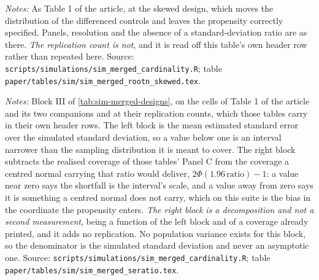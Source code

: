 \documentclass[
  12pt]{article}
\newcommand{\1}[1]{\mathds{1}\left[#1\right]}
\theoremstyle{plain}
\theoremstyle{definition}
\theoremstyle{definition}
\theoremstyle{remark}
\begin{document}
\begin{table}[p]
\centering
\begin{threeparttable}
\caption{The shipped engine at three cardinalities: the skewed design}
\label{tab:sim-merged-rootn-skewed}
\footnotesize

\begin{tablenotes}\footnotesize
\item \textit{Notes:} As Table 1 of the article, at the skewed
design, which moves the distribution of the differenced controls and leaves the
propensity correctly specified. Panels, resolution and the absence of a
standard-deviation ratio are as there. \emph{The replication count is not}, and
it is read off this table's own header row rather than repeated here. Source:
\texttt{scripts/simulations/sim\_merged\_cardinality.R}; table
\texttt{paper/tables/sim/sim\_merged\_rootn\_skewed.tex}.
\end{tablenotes}
\end{threeparttable}
\end{table}

\begin{table}[p]
\centering
\begin{threeparttable}
\caption{The interval's scale, and the coverage shortfall it accounts for}
\label{tab:sim-merged-seratio}
\footnotesize

\begin{tablenotes}\footnotesize
\item \textit{Notes:} Block III of \cref{tab:sim-merged-designs}, on the cells of
Table 1 of the article and its two companions and at their
replication counts, which those tables carry in their own header rows. The left
block is the mean estimated standard error over the simulated standard deviation,
so a value below one is an interval narrower than the sampling distribution it is
meant to cover. The right block subtracts the realised coverage of those tables'
Panel C from the coverage a centred normal carrying that ratio would deliver,
$2\Phi(1.96\,\mathrm{ratio})-1$: a value near zero says the shortfall is the
interval's scale, and a value away from zero says it is something a centred
normal does not carry, which on this suite is the bias in the coordinate the
propensity enters. \emph{The right block is a decomposition and not a second
measurement}, being a function of the left block and of a coverage already
printed, and it adds no replication. No population variance exists for this
block, so the denominator is the simulated standard deviation and never an
asymptotic one. Source:
\texttt{scripts/simulations/sim\_merged\_cardinality.R}; table
\texttt{paper/tables/sim/sim\_merged\_seratio.tex}.
\end{tablenotes}
\end{threeparttable}
\end{table}
\end{document}

